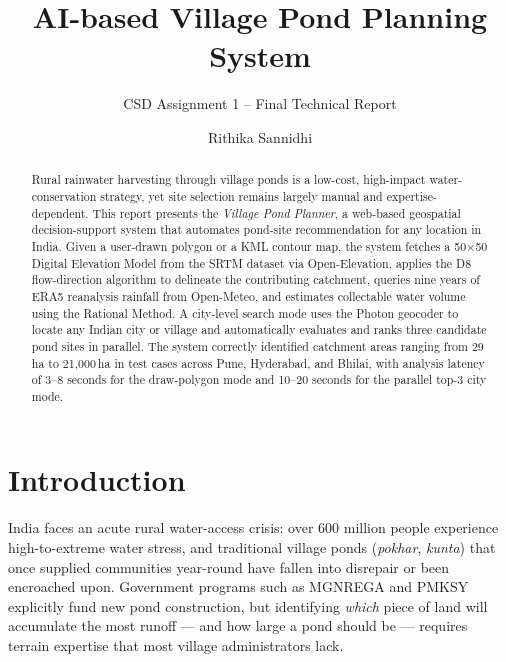 \documentclass[manuscript,screen,review]{acmart}
\begin{document}
\title{AI-based Village Pond Planning System}
\subtitle{CSD Assignment 1 -- Final Technical Report}

\author{Rithika Sannidhi}

\renewcommand{\shortauthors}{Sannidhi et al.}

\begin{abstract}
Rural rainwater harvesting through village ponds is a low-cost,
high-impact water-conservation strategy, yet site selection remains
largely manual and expertise-dependent. This report presents the
\emph{Village Pond Planner}, a web-based geospatial decision-support
system that automates pond-site recommendation for any location in
India. Given a user-drawn polygon or a KML contour map, the system
fetches a 50$\times$50 Digital Elevation Model from the SRTM dataset
via Open-Elevation, applies the D8 flow-direction algorithm to
delineate the contributing catchment, queries nine years of ERA5
reanalysis rainfall from Open-Meteo, and estimates collectable water
volume using the Rational Method. A city-level search mode uses the
Photon geocoder to locate any Indian city or village and
automatically evaluates and ranks three candidate pond sites in
parallel. The system correctly identified catchment areas ranging from
29\,ha to 21{,}000\,ha in test cases across Pune, Hyderabad, and
Bhilai, with analysis latency of 3--8 seconds for the draw-polygon
mode and 10--20 seconds for the parallel top-3 city mode.
\end{abstract}


\maketitle

\section{Introduction}
\label{sec:intro}

India faces an acute rural water-access crisis: over 600 million
people experience high-to-extreme water stress, and traditional
village ponds (\textit{pokhar}, \textit{kunta}) that once supplied
communities year-round have fallen into disrepair or been encroached
upon. Government programs such as MGNREGA and PMKSY explicitly fund
new pond construction, but identifying \emph{which} piece of land
will accumulate the most runoff — and how large a pond should be —
requires terrain expertise that most village administrators lack.
\end{document}
